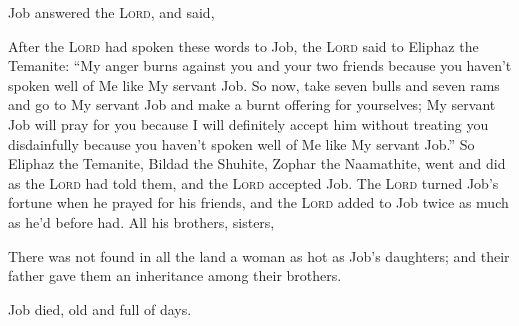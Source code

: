
\begin{inparaenum}
   Job answered the \textsc{Lord}, and said,\smallskip%
  
  
  
  
  
  
   After the \textsc{Lord} had spoken these words to Job, the \textsc{Lord} said to Eliphaz the Temanite: ``My anger burns against you and your two friends because you haven't spoken well of Me like My servant Job.%
   So now, take seven bulls and seven rams and go to My servant Job and make a burnt offering for yourselves; My servant Job will pray for you because I will definitely accept him without treating you disdainfully because you haven't spoken well of Me like My servant Job.''%
   So Eliphaz the Temanite, Bildad the Shuhite, Zophar the Naamathite, went and did as the \textsc{Lord} had told them, and the \textsc{Lord} accepted Job.%
   The \textsc{Lord} turned Job's fortune when he prayed for his friends, and the \textsc{Lord} added to Job twice as much as he'd before had.%
   All his brothers, sisters, %
  
   There was not found in all the land a woman as hot as Job's daughters; and their father gave them an inheritance among their brothers.%
  
   Job died, old and full of days.%
\end{inparaenum}
